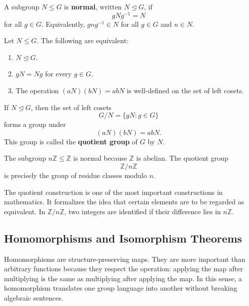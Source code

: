 \begin{definition}
A subgroup $N\leq G$ is \textbf{normal}, written $N\trianglelefteq G$, if
\[
    gNg^{-1}=N
\]
for all $g\in G$. Equivalently, $gng^{-1}\in N$ for all $g\in G$ and $n\in N$.
\end{definition}

\begin{proposition}
Let $N\leq G$. The following are equivalent:
\begin{enumerate}
    \item $N\trianglelefteq G$.
    \item $gN=Ng$ for every $g\in G$.
    \item The operation $(aN)(bN)=abN$ is well-defined on the set of left cosets.
\end{enumerate}
\end{proposition}

\newpage

\begin{definition}
If $N\trianglelefteq G$, then the set of left cosets
\[
    G/N=\{gN:g\in G\}
\]
forms a group under
\[
    (aN)(bN)=abN.
\]
This group is called the \textbf{quotient group} of $G$ by $N$.
\end{definition}

\begin{example}
The subgroup $n\mathbb{Z}\leq\mathbb{Z}$ is normal because $\mathbb{Z}$ is abelian. The quotient group
\[
    \mathbb{Z}/n\mathbb{Z}
\]
is precisely the group of residue classes modulo $n$.
\end{example}


\begin{remark}
The quotient construction is one of the most important constructions in mathematics. It formalizes the idea that certain elements are to be regarded as equivalent. In $\mathbb{Z}/n\mathbb{Z}$, two integers are identified if their difference lies in $n\mathbb{Z}$.
\end{remark}

\subsection{Homomorphisms and Isomorphism Theorems}


Homomorphisms are structure-preserving maps. They are more important than arbitrary functions because they respect the operation: applying the map after multiplying is the same as multiplying after applying the map. In this sense, a homomorphism translates one group language into another without breaking algebraic sentences.

